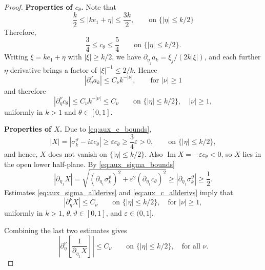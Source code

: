 \documentclass[12pt,a4paper]{amsart}
\numberwithin{equation}{section}
\theoremstyle{plain}
\theoremstyle{definition}
\begin{document}
\begin{proof}
\textbf{Properties of $c_\theta$.}
Note that 
\begin{equation*}
    \frac{k}{2}\leq |ke_1+\eta|\leq \frac{3k}{2},
    \qquad
    \text{on }
    \{|\eta|\leq k/2\}
\end{equation*}
Therefore, 
\begin{equation}\label{eq:aux_c_bounds}
  \frac{3}{4}\leq c_\theta\le\frac{5}{4}
  \qquad\text{on }\{|\eta|\leq k/2\}.
\end{equation}
Writing $\xi=ke_1+\eta$ with $|\xi|\geq k/2$, we have
$\partial_{\eta_j}a_k=\xi_j/(2k|\xi|)$, and each further $\eta$-derivative
brings a factor of $|\xi|^{-1}\leq 2/k$.
Hence
\begin{equation}\label{eq:aux_a_allderivs}
    |\partial_\eta^\nu a_k|\leq C_\nu k^{-|\nu|},
    \qquad
    \text{for }
    |\nu|\geq 1
\end{equation}
and therefore
\begin{equation}\label{eq:aux_c_allderivs}
  |\partial_\eta^\nu c_\theta|\leq C_\nu k^{-|\nu|}\leq C_\nu
  \qquad\text{on }\{|\eta|\leq k/2\},\quad|\nu|\geq 1,
\end{equation}
uniformly in $k> 1$ and $\theta\in[0,1]$.

\textbf{Properties of $X$.}
Due to \eqref{eq:aux_c_bounds},
\begin{equation}\label{eq:aux_Xnonzero}
  |X|= |\sigma_k^\vartheta-i\varepsilon c_\theta| \geq \varepsilon c_\theta\geq \frac{3}{4}\varepsilon>0,
  \qquad
  \text{on } \{|\eta|\leq k/2\},
\end{equation}
and hence, $X$ does not vanish on $\{|\eta|\leq k/2\}$.
Also $\operatorname{Im} X=-\varepsilon c_\theta<0$, so $X$ lies in the open
lower half-plane. By \eqref{eq:aux_sigma_bounds}
\begin{equation}\label{eq:aux_dX_lower}
    |\partial_{\eta_1}X|
    =\sqrt{(\partial_{\eta_1}\sigma_k^\vartheta)^2
    +\varepsilon^2(\partial_{\eta_1}c_\theta)^2}
    \geq |\partial_{\eta_1}\sigma_k^\vartheta|
    \geq\frac{1}{2}.
\end{equation}
Estimates \eqref{eq:aux_sigma_allderivs} and \eqref{eq:aux_c_allderivs} imply that
\begin{equation}\label{eq:aux_X_allderivs}
  |\partial_\eta^\nu X|\leq C_\nu
  \qquad\text{on }\{|\eta|\leq k/2\},\quad\text{for }|\nu|\geq 1,
\end{equation}
uniformly in $k> 1$, $\theta,\vartheta\in[0,1]$, and $\varepsilon\in(0,1]$.

Combining the last two estimates gives 
\begin{equation}\label{eq:aux_inv_dX_allderivs}
  \left|\partial_\eta^\nu\left[\frac{1}{\partial_{\eta_1}X}\right]\right|\leq C_\nu
  \qquad\text{on }\{|\eta|\leq k/2\},\quad\text{for all }\nu.
\end{equation}



\end{proof}
\end{document}

